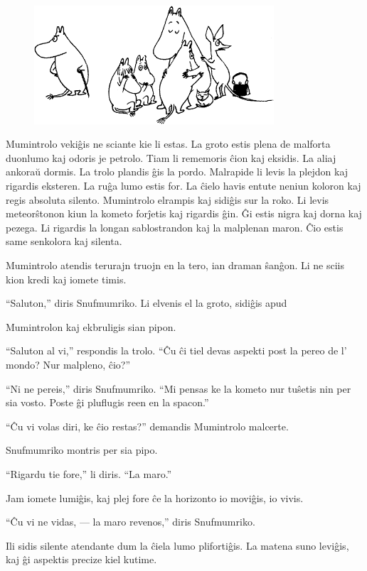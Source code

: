 \begin{figure}[htbp]
\centering
\includegraphics[width=253pt,height=125pt]{10-1.png}
\caption{}
\label{10-1}
\end{figure}

Mumintrolo vekiĝis ne sciante kie li estas. La groto estis plena de malforta duonlumo kaj odoris je petrolo. Tiam li rememoris ĉion kaj eksidis. La aliaj ankoraŭ dormis. La trolo plandis ĝis la pordo. Malrapide li levis la plejdon kaj rigardis eksteren. La ruĝa lumo estis for. La ĉielo havis entute neniun koloron kaj regis absoluta silento. Mumintrolo elrampis kaj sidiĝis sur la roko. Li levis meteorŝtonon kiun la kometo forĵetis kaj rigardis ĝin. Ĝi estis nigra kaj dorna kaj pezega. Li rigardis la longan sablostrandon kaj la malplenan maron. Ĉio estis same senkolora kaj silenta.

Mumintrolo atendis terurajn truojn en la tero, ian draman ŝanĝon. Li ne sciis kion kredi kaj iomete timis.

``Saluton,'' diris Snufmumriko. Li elvenis el la groto, sidiĝis apud

Mumintrolon kaj ekbruligis sian pipon.

``Saluton al vi,'' respondis la trolo. ``Ĉu ĉi tiel devas aspekti post la pereo de l' mondo? Nur malpleno, ĉio?''

``Ni ne pereis,'' diris Snufmumriko. ``Mi pensas ke la kometo nur tuŝetis nin per sia vosto. Poste ĝi pluflugis reen en la spacon.''

``Ĉu vi volas diri, ke ĉio restas?'' demandis Mumintrolo malcerte.

Snufmumriko montris per sia pipo.

``Rigardu tie fore,'' li diris. ``La maro.''

Jam iomete lumiĝis, kaj plej fore ĉe la horizonto io moviĝis, io vivis.

``Ĉu vi ne vidas, --- la maro revenos,'' diris Snufmumriko.

Ili sidis silente atendante dum la ĉiela lumo plifortiĝis. La matena suno leviĝis, kaj ĝi aspektis precize kiel kutime.

